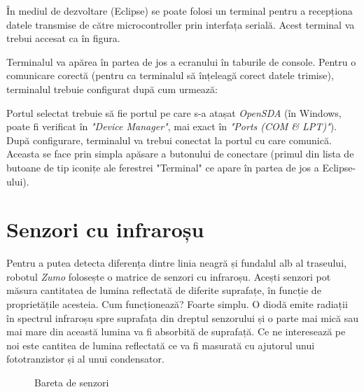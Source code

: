 În mediul de dezvoltare (Eclipse) se poate folosi un terminal pentru a recepționa datele transmise de către microcontroller prin interfața serială. Acest terminal va trebui accesat ca în figura.

Terminalul va apărea în partea de jos a ecranului în taburile de console. Pentru o comunicare corectă (pentru ca terminalul să înțeleagă corect datele trimise), terminalul trebuie configurat după cum urmează:

Portul selectat trebuie să fie portul pe care s-a atașat \textit{OpenSDA} (în Windows, poate fi verificat în \textit{"Device Manager"}, mai exact în \textit{"Ports (COM \& LPT)"}). După configurare, terminalul va trebui conectat la portul cu care comunică. Aceasta se face prin simpla apăsare a butonului de conectare (primul din lista de butoane de tip iconițe ale ferestrei "Terminal" ce apare în partea de jos a Eclipse-ului).

\section{Senzori cu infraroșu}

Pentru a putea detecta diferența dintre linia neagră și fundalul alb al traseului, robotul \textit{Zumo} folosește o matrice de senzori cu infraroșu. Acești senzori pot măsura cantitatea de lumina reflectată de diferite suprafațe, în funcție de proprietățile acesteia. Cum funcționează? Foarte simplu. O diodă emite radiații în spectrul infraroșu spre suprafața din dreptul senzorului și o parte mai mică sau mai mare din această lumina va fi absorbită de suprafață. Ce ne interesează pe noi este cantitea de lumina reflectată ce va fi masurată cu ajutorul unui fototranzistor și al unui condensator.

\begin{figure}
    \vspace{-20pt}
    \vspace{-15pt}
    \caption{\label{fig:CodeWarrior-InfraredSensors} Bareta de senzori}
    \vspace{-20pt}
\end{figure}

